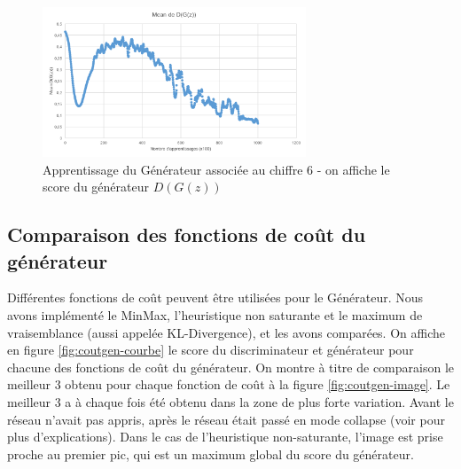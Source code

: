 \begin{figure}[h!]
\begin{center}
\includegraphics[width=0.7\textwidth]{images/18_01_17-GAN/courbe.png}\caption{Apprentissage du Générateur associée au chiffre 6 - on affiche le score du générateur $D(G(z))$}
\end{center}
\end{figure}

\subsection{Comparaison des fonctions de coût du générateur}
Différentes fonctions de coût peuvent être utilisées pour le Générateur. Nous avons implémenté le MinMax, l'heuristique non saturante et le maximum de vraisemblance (aussi appelée KL-Divergence), et les avons comparées. On affiche en figure \ref{fig:coutgen-courbe} le score du discriminateur et générateur pour chacune des fonctions de coût du générateur. On montre à titre de comparaison le meilleur 3 obtenu pour chaque fonction de coût à la figure \ref{fig:coutgen-image}. Le meilleur 3 a à chaque fois été obtenu dans la zone de plus forte variation. Avant le réseau n'avait pas appris, après le réseau était passé en mode collapse (voir \label{mode-collapse} pour plus d'explications). Dans le cas de l'heuristique non-saturante, l'image est prise proche au premier pic, qui est un maximum global du score du générateur.

